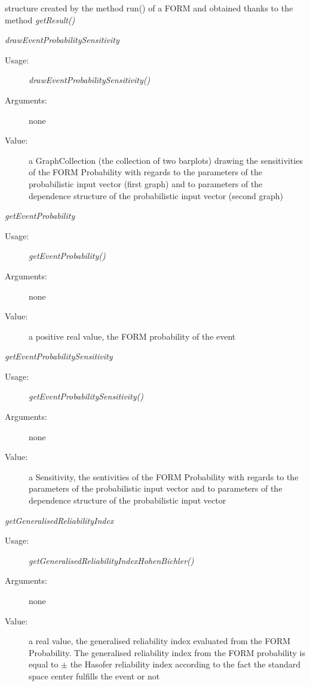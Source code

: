 \begin{description}

\item[Usage:] structure created by the method run() of a FORM and obtained thanks to the method \textit{getResult()}

\item[Some methods :]  \rule{0pt}{1em}

\begin{description}

\item \textit{drawEventProbabilitySensitivity}
\begin{description}
\item[Usage:] \textit{drawEventProbabilitySensitivity()}
\item[Arguments:] none
\item[Value:]  a GraphCollection (the collection of two barplots) drawing the sensitivities of the FORM Probability with regards to the parameters of the probabilistic input vector (first graph) and to parameters of the dependence structure of the probabilistic input vector (second graph)
\end{description}
\bigskip

\item \textit{getEventProbability}
\begin{description}
\item[Usage:] \textit{getEventProbability()}
\item[Arguments:] none
\item[Value:]  a positive real value, the FORM probability of the event
\end{description}
\bigskip

\item \textit{getEventProbabilitySensitivity}
\begin{description}
\item[Usage:] \textit{getEventProbabilitySensitivity()}
\item[Arguments:] none
\item[Value:]  a Sensitivity, the sentivities of the FORM Probability with regards to the parameters of the probabilistic input vector and to parameters of the dependence structure of the probabilistic input vector
\end{description}
\bigskip

\item \textit{getGeneralisedReliabilityIndex}
\begin{description}
\item[Usage:] \textit{getGeneralisedReliabilityIndexHohenBichler()}
\item[Arguments:] none
\item[Value:]  a  real value, the generalised reliability index evaluated from the FORM Probability. The generalised reliability index from the FORM probability is equal to $\pm$ the Hasofer reliability index according to the fact the standard space center fulfills the event or not
\end{description}

\end{description}


\end{description}

